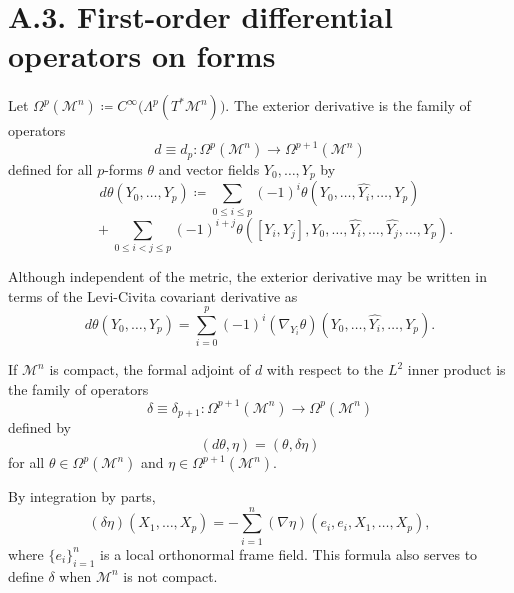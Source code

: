 \section*{A.3. First-order differential operators on forms}

\begin{definition}
\label{appa-def-exterior-derivative}

Let \(\Omega^p(\mathcal M^n)\coloneqq C^\infty\bigl(\Lambda^p(T^*\mathcal M^n)\bigr)\). The exterior derivative is the family of operators
\[
d\equiv d_p:\Omega^p(\mathcal M^n)\to \Omega^{p+1}(\mathcal M^n)
\]
defined for all \(p\)-forms \(\theta\) and vector fields \(Y_0,\ldots,Y_p\) by
\[
d\theta(Y_0,\ldots,Y_p)
\coloneqq \sum_{0\le i\le p}(-1)^i\theta(Y_0,\ldots,\widehat{Y_i},\ldots,Y_p)
\]
\[
\qquad + \sum_{0\le i<j\le p}(-1)^{i+j}\theta([Y_i,Y_j],Y_0,\ldots,\widehat{Y_i},\ldots,\widehat{Y_j},\ldots,Y_p).
\]
\end{definition}

\begin{remark}
\label{appa-rem-exterior-derivative-covariant-form}

Although independent of the metric, the exterior derivative may be written in terms of the Levi-Civita covariant derivative as
\[
d\theta(Y_0,\ldots,Y_p)=\sum_{i=0}^p (-1)^i (\nabla_{Y_i}\theta)(Y_0,\ldots,\widehat{Y_i},\ldots,Y_p).
\]
\end{remark}

\begin{definition}
\label{appa-def-formal-adjoint-exterior-derivative}

If \(\mathcal M^n\) is compact, the formal adjoint of \(d\) with respect to the \(L^2\) inner product is the family of operators
\[
\delta\equiv \delta_{p+1}:\Omega^{p+1}(\mathcal M^n)\to \Omega^p(\mathcal M^n)
\]
defined by
\[
(d\theta,\eta)=(\theta,\delta\eta)
\]
for all \(\theta\in \Omega^p(\mathcal M^n)\) and \(\eta\in \Omega^{p+1}(\mathcal M^n)\).
\end{definition}

\begin{remark}
\label{appa-rem-adjoint-exterior-derivative-covariant-form}

By integration by parts,
\[
(\delta\eta)(X_1,\ldots,X_p)
= - \sum_{i=1}^n (\nabla\eta)(e_i,e_i,X_1,\ldots,X_p),
\]
where \(\{e_i\}_{i=1}^n\) is a local orthonormal frame field. This formula also serves to define \(\delta\) when \(\mathcal M^n\) is not compact.
\end{remark}

